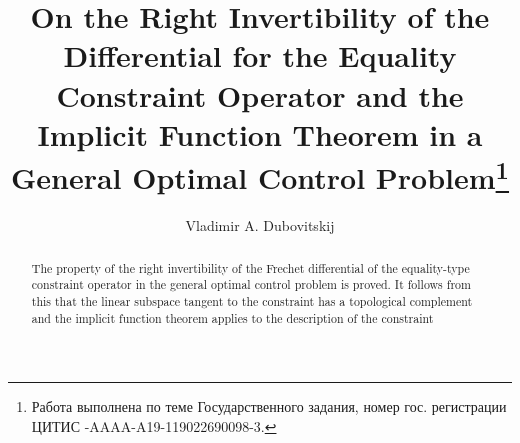 \begin{englishtitle} %
\title{On the Right Invertibility of the Differential for the Equality Constraint Operator and the Implicit Function Theorem in a General Optimal Control Problem\thanks{Работа выполнена по теме Государственного задания, номер гос. регистрации ЦИТИС -AAAA-A19-119022690098-3.
}}
\author{Vladimir A. Dubovitskij
}

\maketitle

\begin{abstract}
 The property of the right invertibility of the Frechet differential of the equality-type constraint operator in the general optimal control problem is proved. It follows from this that the linear subspace tangent to the constraint has a topological complement and the implicit function theorem applies to the description of the constraint

\end{abstract}
\end{englishtitle}

\iffalse

%
%

